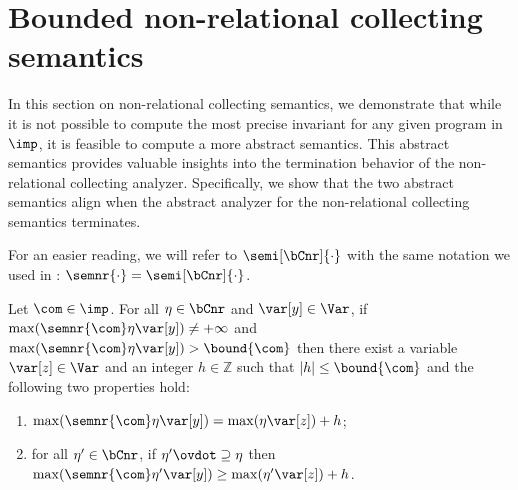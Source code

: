 \section{Bounded non-relational collecting
  semantics}\label{sec:boundingnonrel}

In this section on non-relational collecting semantics, we demonstrate
that while it is not possible to compute the most precise invariant
for any given program in \(\imp\), it is feasible to compute a more
abstract semantics. This abstract semantics provides valuable insights
into the termination behavior of the non-relational collecting
analyzer. Specifically, we show that the two abstract semantics align
when the abstract analyzer for the non-relational collecting semantics
terminates.

For an easier reading, we will refer to \(\semi[\bCnr]{\cdot}\) with
the same notation we used in :
\(\semnr{\cdot} = \semi[\bCnr]{\cdot}\).

\begin{lemma}\label{le:incnr}
  Let \(\com\in \imp\).
  For all \(\eta \in \bCnr\) and \(\var[y] \in \Var\), if
  \(\max(\semnr{\com} \eta \var[y]) \neq +\infty\) and
  \(\max(\semnr{\com}\eta \var[y]) > \bound{\com}\) then there exist a
  variable \(\var[z] \in \Var\) and an integer \(h \in \mathbb{Z}\)
  such that \(|h| \leq \bound{\com}\) and the following two properties
  hold:
  \begin{enumerate}[label=(\roman*)]
  \item\label{point1nrdef}
    \(\max(\semnr{\com}\eta \var[y]) = \max(\eta \var[z]) + h\);
  \item\label{point2nrdef} for all \(\eta' \in \bCnr\), if
    \(\eta' \ovdot\supseteq \eta\)
    then
    \(\max(\semnr{\com}\eta' \var[y]) \geq \max(\eta' \var[z]) + h\).
  \end{enumerate}
\end{lemma}

